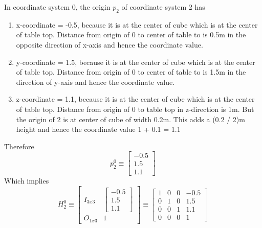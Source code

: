 \documentclass[12pt]{article}
\begin{document}
In coordinate system 0, the origin $ p_{2} $ of coordinate system 2 has
\begin{enumerate}[nolistsep]
  \item x-coordinate = -0.5, because it is at the center of cube which is at the center of table top. Distance from origin of 0 to center of table to is 0.5m in the opposite direction of x-axis and hence the coordinate value.
  \item y-coordinate = 1.5, because it is at the center of cube which is at the center of table top. Distance from origin of 0 to center of table to is 1.5m in the direction of y-axis and hence the coordinate value.
  \item z-coordinate = 1.1, because it is at the center of cube which is at the center of table top. Distance from origin of 0 to table top in z-direction is 1m. But the origin of 2 is at center of cube of width 0.2m. This adds a (0.2 / 2)m height and hence the coordinate value 1 + 0.1 = 1.1
\end{enumerate}
Therefore
\[
  p_{2}^{0} \equiv \begin{bmatrix} -0.5 \\ 1.5 \\ 1.1 \end{bmatrix}
\]
Which implies
\[
  H_{2}^{0}
  \equiv \begin{bmatrix} I_{3x3} & \begin{bmatrix} -0.5 \\ 1.5 \\ 1.1 \end{bmatrix} \\ O_{1x3} & 1 \end{bmatrix}
  \equiv \begin{bmatrix}
          1 & 0 & 0 & -0.5\\
          0 & 1 & 0 & 1.5\\
          0 & 0 & 1 & 1.1\\
          0 & 0 & 0 & 1
        \end{bmatrix}
\]
\end{document}
